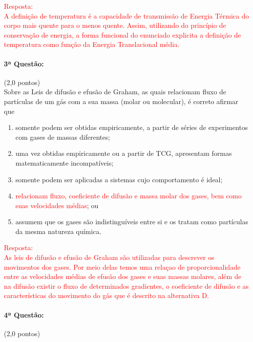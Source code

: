\documentclass[12pt,a4paper]{article}
\begin{document}
\textcolor{red}{Resposta: \\
A definição de temperatura é  a capacidade de transmissão de Energia Térmica do corpo mais quente para o menos quente. Assim, utilizando do princípio de conservação de energia, a forma funcional do enunciado explicita a definição de temperatura como função da Energia Translacional média.} \\[0.1cm]



\paragraph{3ª Questão:} (2,0 pontos) \\ [0.3cm]


Sobre as Leis de difusão e efusão de Graham, as quais relacionam 
fluxo de partículas de um gás com a sua massa (molar ou molecular), 
é correto afirmar que 
\begin{enumerate}[label = (\alph*)]
    \item somente podem ser obtidas empiricamente, a partir de séries de experimentos com gases de massas diferentes;
    \item uma vez obtidas empiricamente ou a partir de TCG, apresentam formas matematicamente incompatíveis;
    \item somente podem ser aplicadas a sistemas cujo comportamento é ideal; 
    \item \textcolor{red}{relacionam fluxo, coeficiente de difusão e massa molar dos gases, bem como suas velocidades médias}; ou
    \item assumem que os gases são indistinguíveis entre si e os tratam como partículas da mesma natureza química. \\    
\end{enumerate}

\textcolor{red}{Resposta: \\
As leis de difusão e efusão de Graham são utilizadas para descrever os movimentos dos gases. Por meio delas temos uma relaçao de proporcionalidade entre as velocidades médias de efusão dos gases e suas massas molares, além de na difusão existir o fluxo de determinados gradientes, o coeficiente de difusão e as características do movimento do gás que é descrito na alternativa D.} \\ [0.5cm]


\paragraph{4ª Questão:} (2,0 pontos) \\ [0.5cm]
\end{document}
